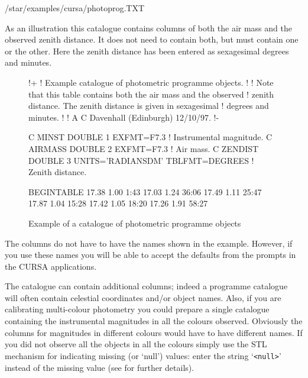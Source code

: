 \documentclass[twoside,11pt,nolof]{starlink}
\begin{document}
\begin{enumerate}
\begin{description}
\begin{terminalv}
/star/examples/cursa/photoprog.TXT
\end{terminalv}

     As an illustration this catalogue contains columns of both the air mass
     and the observed zenith distance.  It does not need to contain both,
     but must contain one or the other.  Here the zenith distance has been
     entered as sexagesimal degrees and minutes.

\begin{figure}[htbp]

\begin{terminalv}
!+
! Example catalogue of photometric programme objects.
!
! Note that this table contains both the air mass and the observed
! zenith distance.  The zenith distance is given in sexagesimal
! degrees and minutes.
!
! A C Davenhall (Edinburgh) 12/10/97.
!-

C MINST   DOUBLE  1 EXFMT=F7.3    ! Instrumental magnitude.
C AIRMASS DOUBLE  2 EXFMT=F7.3    ! Air mass.
C ZENDIST DOUBLE  3 UNITS='RADIANS{DM}' TBLFMT=DEGREES ! Zenith distance.

BEGINTABLE
 17.38  1.00   1:43
 17.03  1.24  36:06
 17.49  1.11  25:47
 17.87  1.04  15:28
 17.42  1.05  18:20
 17.26  1.91  58:27
\end{terminalv}

\begin{quote}
\caption{Example of a catalogue of photometric programme objects
\label{PHOTOPRGCAT} }
\end{quote}

\end{figure}

     The columns do not have to have the names shown in the example.
     However, if you use these names you will be able to accept the defaults
     from the prompts in the CURSA applications.

     The catalogue can contain additional columns; indeed a programme catalogue
     will often contain celestial coordinates and/or object names.  Also, if
     you are calibrating multi-colour photometry you could prepare a single
     catalogue containing the instrumental magnitudes in all the colours
     observed.  Obviously the columns for magnitudes in different colours
     would have to have different names.  If you did not observe all the
     objects in all the colours simply use the STL mechanism for indicating
     missing (or `null') values: enter the string `\verb-<null>-' instead of
     the missing value (see  for further details).


\end{description}
\end{enumerate}
\end{document}
